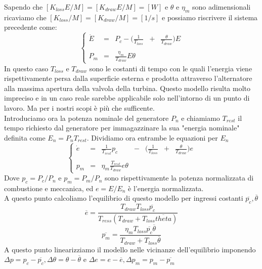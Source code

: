 Sapendo che $[K_{loss}E/M]=[K_{draw}E/M]=[W]$ e $\theta$ e $\eta_m$ sono adimensionali ricaviamo che $[K_{loss}/M]=[K_{draw}/M]=[1/s]$ e possiamo riscrivere il sistema precedente come:
\begin{equation}
\left\{
\begin{array}{ccccc}
\dot{E}&=&P_c-\big(\frac{1}{T_{loss}}&+&\frac{\theta}{T_{draw}}\big)E\\
\\
P_m&=&\frac{\eta_m}{T_{draw}}E\theta &&
\end{array}
\right.
\end{equation}
In questo caso $T_{loss}$ e $T_{draw}$ sono le costanti di tempo con le quali l'energia viene rispettivamente persa dalla superficie esterna e prodotta attraverso l'alternatore alla massima apertura della valvola della turbina.
Questo modello risulta molto impreciso e in un caso reale sarebbe applicabile solo nell'intorno di un punto di lavoro. Ma per i nostri scopi è più che sufficente.\\
Introduciamo ora la potenza nominale del generatore $P_n$ e chiamiamo $T_{rest}$ il tempo richiesto dal generatore per immagazzinare la sua "energia nominale" definita come $E_n=P_nT_{rest}$. Dividiamo ora entrambe le equazioni per $E_n$
\begin{equation}
\left\{
\begin{array}{ccccccc}
\dot{e}&=&\frac{1}{T_{rest}}p_c&-&\big(\frac{1}{T_{loss}}&+&\frac{\theta}{T_{draw}}\big)e\\
\\
p_m&=&\eta_m\frac{T_{rest}}{T_{draw}}e\theta&&&&
\end{array}
\right.
\end{equation}
Dove $p_c=P_c/P_n$ e $p_m= P_m/P_n$ sono rispettivamente la potenza normalizzata di combustione e meccanica, ed $e=E/E_n$ è l'energia normalizzata.\\
A questo punto calcoliamo l'equilibrio di questo modello per ingressi costanti $\overline{p_c},\overline{\theta}$
$$\overline{e}=\frac{T_{draw}T_{loss}\overline{p_c}}{T_{ress}(T_{draw}+T_{loss}\overline{theta})}$$
$$\overline{p_m}=\frac{\eta_mT_{loss}\overline{p_c}\overline{\theta}}{T_{draw}+T_{loss}\overline{\theta}}$$
A questo punto linearizziamo il modello nelle vicinanze dell'equilibrio imponendo $\Delta p=p_c-\overline{p_c}, \Delta\theta=\theta-\overline{\theta}$ e $\Delta e = e- \overline{e}, \Delta p_m =p_m-\overline{p_m}$
